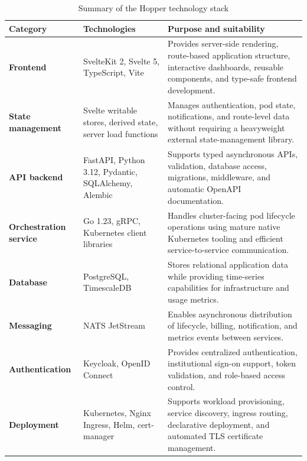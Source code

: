 \documentclass[12pt,a4paper]{article}
\begin{document}
\begin{table}[!htbp]
\centering
\caption{Summary of the Hopper technology stack}
\label{tab:tech-stack}
\small
\setlength{\tabcolsep}{4pt}
\renewcommand{\arraystretch}{1.25}
\begin{tabularx}{\textwidth}{
    >{\raggedright\arraybackslash\bfseries}p{}
    >{\raggedright\arraybackslash}p{}
    >{\raggedright\arraybackslash}X
}
\toprule
Category & Technologies & Purpose and suitability \\
\midrule

Frontend &
SvelteKit 2, Svelte 5, TypeScript, Vite &
Provides server-side rendering, route-based application structure, interactive dashboards, reusable components, and type-safe frontend development. \\

State management &
Svelte writable stores, derived state, server load functions &
Manages authentication, pod state, notifications, and route-level data without requiring a heavyweight external state-management library. \\

API backend &
FastAPI, Python 3.12, Pydantic, SQLAlchemy, Alembic &
Supports typed asynchronous APIs, validation, database access, migrations, middleware, and automatic OpenAPI documentation. \\

Orchestration service &
Go 1.23, gRPC, Kubernetes client libraries &
Handles cluster-facing pod lifecycle operations using mature native Kubernetes tooling and efficient service-to-service communication. \\

Database &
PostgreSQL, TimescaleDB &
Stores relational application data while providing time-series capabilities for infrastructure and usage metrics. \\

Messaging &
NATS JetStream &
Enables asynchronous distribution of lifecycle, billing, notification, and metrics events between services. \\

Authentication &
Keycloak, OpenID Connect &
Provides centralized authentication, institutional sign-on support, token validation, and role-based access control. \\

Deployment &
Kubernetes, Nginx Ingress, Helm, cert-manager &
Supports workload provisioning, service discovery, ingress routing, declarative deployment, and automated TLS certificate management. \\


\end{tabularx}
\end{table}
\end{document}
